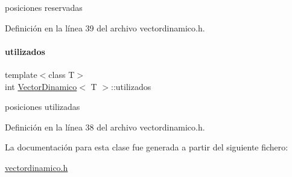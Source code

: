 posiciones reservadas 

Definición en la línea 39 del archivo vectordinamico.\+h.

\mbox{\label{classVectorDinamico_ae27af4a21ba39afd1fb82f9b255e05f5}} 
\paragraph{\texorpdfstring{utilizados}{utilizados}}
{\footnotesize\ttfamily template$<$class T$>$ \\
int \hyperlink{classVectorDinamico}{Vector\+Dinamico}$<$ T $>$\+::utilizados\hspace{0.3cm}{\ttfamily [private]}}

posiciones utilizadas 

Definición en la línea 38 del archivo vectordinamico.\+h.



La documentación para esta clase fue generada a partir del siguiente fichero\+:\begin{DoxyCompactItemize}
\item 
\hyperlink{vectordinamico_8h}{vectordinamico.\+h}\end{DoxyCompactItemize}
